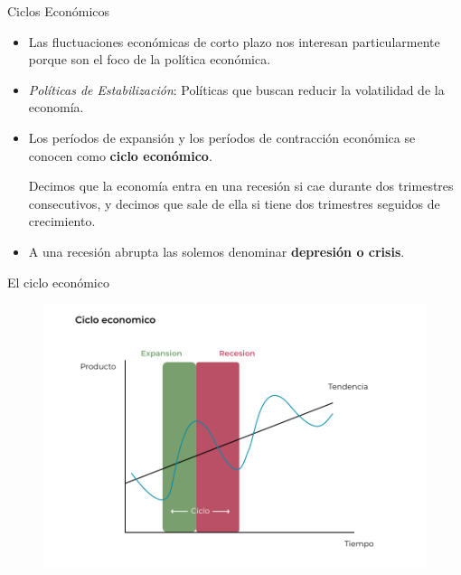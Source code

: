\documentclass{beamer}
\begin{document}

\begin{frame}{Ciclos Económicos}
    \begin{itemize}
        \item Las fluctuaciones económicas de corto plazo nos interesan particularmente porque son el foco de la política económica.
        \item \textit{Políticas de Estabilización}: Políticas que buscan reducir la volatilidad de la economía.
        \item Los períodos de expansión y los períodos de contracción económica se conocen como \textbf{ciclo económico}.
        \begin{boxA}
            Decimos que la economía entra en una recesión si cae durante dos trimestres consecutivos, y
            decimos que sale de ella si tiene dos trimestres seguidos de crecimiento.
        \end{boxA}
        \item A una recesión abrupta las solemos denominar \textbf{depresión o crisis}.
    \end{itemize}
\end{frame}

\begin{frame}{El ciclo económico}
    \begin{figure} [H]   
        \includegraphics[scale=0.75]{../Figures/32.7.pdf}
    \end{figure}
\end{frame}
\end{document}
